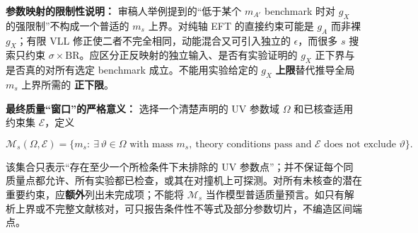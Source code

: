 \documentclass[
  chinese,
  UTF8]{ctexart}
\begin{document}
\textbf{参数映射的限制性说明：} 审稿人举例提到的``低于某个 \(m_{A'}\)
benchmark 时对 \(g_X\) 的强限制''不构成一个普适的 \(m_s\) 上界。对纯轴
EFT 的直接约束可能是 \(g_A\) 而非裸 \(g_X\)；有限 VLL
修正使二者不完全相同，动能混合又可引入独立的 \(\epsilon\)，而很多 \(s\)
搜索只约束
\(\sigma\times\mathrm{BR}\)。应区分正反映射的独立输入、是否有实验证明的
\(g_X\) 正下界与是否真的对所有选定 benchmark 成立。不能用实验给定的
\(g_X\) \textbf{上限}替代推导全局 \(m_s\) 上界所需的 \textbf{正下限}。

\textbf{最终质量``窗口''的严格意义：} 选择一个清楚声明的 UV 参数域
\(\Omega\) 和已核查适用约束集 \(\mathcal E\)，定义

\[
 \mathcal M_s(\Omega,\mathcal E)=\bigl\{m_s:\ \exists\,\vartheta\in\Omega\text{ with mass }m_s,\ \text{theory conditions pass and }\mathcal E\text{ does not exclude }\vartheta\bigr\}.
\]

该集合只表示``存在至少一个所检条件下未排除的 UV
参数点''；并不保证每个同质量点都允许、所有实验都已检查，或其在对撞机上可探测。对所有未核查的潜在重要约束，应\textbf{额外}列出未完成项；不能将
\(\mathcal M_s\)
当作模型普适质量预言。如只有解析上界或不完整文献核对，可只报告条件性不等式及部分参数切片，不编造区间端点。
\end{document}
